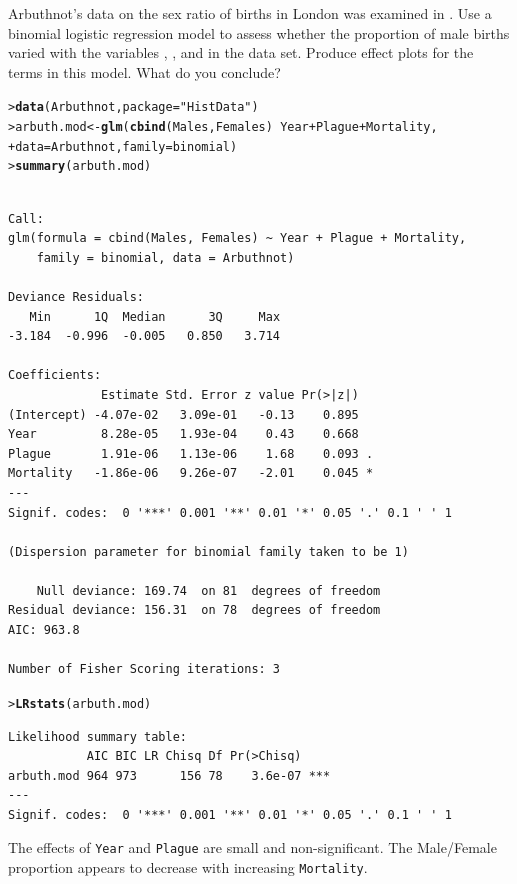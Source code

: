 \documentclass[10pt]{report}\usepackage[]{graphicx}\usepackage[]{color}
\makeatletter
\newcommand{\hlstr}[1]{\textcolor[rgb]{0.192,0.494,0.8}{#1}}%
\newcommand{\hlopt}[1]{\textcolor[rgb]{0,0,0}{#1}}%
\newcommand{\hlstd}[1]{\textcolor[rgb]{0.345,0.345,0.345}{#1}}%
\newcommand{\hlkwb}[1]{\textcolor[rgb]{0.69,0.353,0.396}{#1}}%
\newcommand{\hlkwc}[1]{\textcolor[rgb]{0.333,0.667,0.333}{#1}}%
\newcommand{\hlkwd}[1]{\textcolor[rgb]{0.737,0.353,0.396}{\textbf{#1}}}%
\newenvironment{kframe}{%
 \def\at@end@of@kframe{}%
 \ifinner\ifhmode%
  \def\at@end@of@kframe{\end{minipage}}%
  \begin{minipage}{\columnwidth}%
 \fi\fi%
 \def\FrameCommand##1{\hskip\@totalleftmargin \hskip-\fboxsep
 \colorbox{shadecolor}{##1}\hskip-\fboxsep
     \hskip-\linewidth \hskip-\@totalleftmargin \hskip\columnwidth}%
 \MakeFramed {\advance\hsize-\width
   \@totalleftmargin\z@ \linewidth\hsize
   \@setminipage}}%
 {\par\unskip\endMakeFramed%
 \at@end@of@kframe}
\newenvironment{knitrout}{}{} %
\renewenvironment{knitrout}{\small\renewcommand{\baselinestretch}{.85}}{} %
\makeatother
\begin{document}
\begin{Exercises}

 \exercise Arbuthnot's data on the sex ratio of births in London was examined
 in .  Use a binomial logistic regression model to
 assess whether the proportion of male births varied with the variables
 , , and  in the 
 data set.  Produce effect plots for the terms in this model. What do you
 conclude?
	\begin{ans}
\begin{knitrout}\footnotesize
{}\color{fgcolor}\begin{kframe}
\begin{alltt}
\hlstd{> }\hlkwd{data}\hlstd{(Arbuthnot,} \hlkwc{package}\hlstd{=}\hlstr{"HistData"}\hlstd{)}
\hlstd{> }\hlstd{arbuth.mod} \hlkwb{<-} \hlkwd{glm}\hlstd{(}\hlkwd{cbind}\hlstd{(Males, Females)} \hlopt{~} \hlstd{Year} \hlopt{+} \hlstd{Plague} \hlopt{+} \hlstd{Mortality,}
\hlstd{+ }                  \hlkwc{data}\hlstd{=Arbuthnot,} \hlkwc{family}\hlstd{=binomial)}
\hlstd{> }\hlkwd{summary}\hlstd{(arbuth.mod)}
\end{alltt}
\begin{verbatim}

Call:
glm(formula = cbind(Males, Females) ~ Year + Plague + Mortality, 
    family = binomial, data = Arbuthnot)

Deviance Residuals: 
   Min      1Q  Median      3Q     Max  
-3.184  -0.996  -0.005   0.850   3.714  

Coefficients:
             Estimate Std. Error z value Pr(>|z|)  
(Intercept) -4.07e-02   3.09e-01   -0.13    0.895  
Year         8.28e-05   1.93e-04    0.43    0.668  
Plague       1.91e-06   1.13e-06    1.68    0.093 .
Mortality   -1.86e-06   9.26e-07   -2.01    0.045 *
---
Signif. codes:  0 '***' 0.001 '**' 0.01 '*' 0.05 '.' 0.1 ' ' 1

(Dispersion parameter for binomial family taken to be 1)

    Null deviance: 169.74  on 81  degrees of freedom
Residual deviance: 156.31  on 78  degrees of freedom
AIC: 963.8

Number of Fisher Scoring iterations: 3
\end{verbatim}
\begin{alltt}
\hlstd{> }\hlkwd{LRstats}\hlstd{(arbuth.mod)}
\end{alltt}
\begin{verbatim}
Likelihood summary table:
           AIC BIC LR Chisq Df Pr(>Chisq)    
arbuth.mod 964 973      156 78    3.6e-07 ***
---
Signif. codes:  0 '***' 0.001 '**' 0.01 '*' 0.05 '.' 0.1 ' ' 1
\end{verbatim}
\end{kframe}
\end{knitrout}
    The effects of \texttt{Year} and \texttt{Plague} are small and non-significant.
    The Male/Female proportion appears to decrease with increasing \texttt{Mortality}.


\end{ans}
\end{Exercises}
\end{document}

